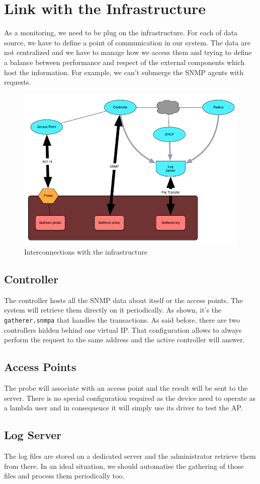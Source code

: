 \section{Link with the Infrastructure}
As a monitoring, we need to be plug on the infrastructure. For each of data source, we have to define a point of communication in our system. The data are not centralized and we have to manage how we access them and trying to define a balance between performance and respect of the external components which host the information. For example, we can't submerge the SNMP agents with requests.

\begin{figure}[H]
\centering
	\includegraphics[width=1\linewidth]{Pictures/chapter3/interactions.jpg}
	\caption{Interconnections with the infrastructure}
\end{figure}

\subsection{Controller}
The controller hosts all the SNMP data about itself or the access points. The system will retrieve them directly on it periodically. As shown, it's the \texttt{gatherer.snmpa} that handles the transactions. As said before, there are two controllers hidden behind one virtual IP. That configuration allows to always perform the request to the same address and the active controller will answer.
\subsection{Access Points}
The probe will associate with an access point and the result will be sent to the server. There is no special configuration required as the device need to operate as a lambda user and in consequence it will simply use its driver to test the AP. 
\subsection{Log Server} 
The log files are stored on a dedicated server and the administrator retrieve them from there. In an ideal situation, we should automatise the gathering of those files and process them periodically too.
